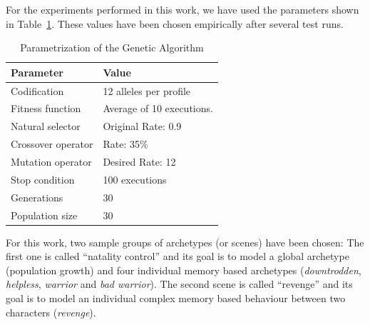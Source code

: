 \documentclass[runningheads]{llncs}
\begin{document}
For the experiments performed in this work, we have used the parameters shown in Table~\ref{fig:ga_parameters}. These values have been chosen empirically after several test runs. 

\begin{table}
\begin{center}
\caption{Parametrization of the Genetic Algorithm}
\label{fig:ga_parameters}
\begin{tabular}{p{3cm}p{7cm}}
\hline\noalign{\smallskip}
\noalign{\smallskip}
Parameter & Value \\
\hline
\noalign{\smallskip}
Codification & 12 alleles per profile\\
Fitness function & Average of 10 executions.\\
Natural selector & Original Rate: 0.9 \\
Crossover operator & Rate: 35\% \\
Mutation operator & Desired Rate: 12 \\
Stop condition & 100 executions\\
Generations & 30\\
Population size & 30 \\
\hline
\end{tabular}


\end{center}
\end{table}



For this work, two sample groups of archetypes (or scenes)  have been chosen: The first one is called ``natality control'' and its goal is to model a global archetype (population growth) and four individual memory based archetypes (\textit{downtrodden}, \textit{helpless}, \textit{warrior} and \textit{bad warrior}). The second scene is called ``revenge'' and its goal is to model an individual complex memory based behaviour between two characters (\textit{revenge}).
\end{document}

